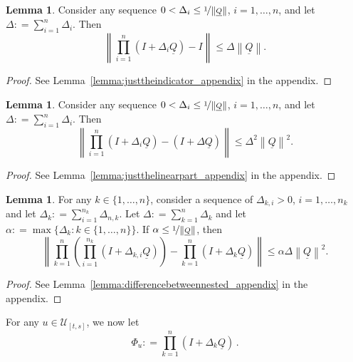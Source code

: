 \documentclass[10pt]{paper}
\theoremstyle{definition}
\newtheorem{lemma}[theorem]{Lemma}
\newcommand{\lrate}{\underline{Q}}
\newcommand{\norm}[1]{\left\lVert #1 \right\rVert}
\newcommand{\coloneqq}{:\!=}
\begin{document}
\begin{lemma}\label{lemma:justtheindicator}
Consider any sequence $0<\Delta_i\leq\nicefrac{1}{\norm{\lrate}}$, $i=1,\dots,n$, and let $\Delta\coloneqq\sum_{i=1}^n\Delta_i$. Then
\begin{equation*}
\norm{\prod_{i=1}^n(I+\Delta_i\lrate)-I}\leq\Delta\norm{\lrate}.
\end{equation*}
\end{lemma}
\begin{proof}
See Lemma~\ref{lemma:justtheindicator_appendix} in the appendix.
\end{proof}

\begin{lemma}\label{lemma:justthelinearpart}
Consider any sequence $0<\Delta_i\leq\nicefrac{1}{\norm{\lrate}}$, $i=1,\dots,n$, and let $\Delta\coloneqq\sum_{i=1}^n\Delta_i$. Then
\begin{equation*}
\norm{\prod_{i=1}^n(I+\Delta_i\lrate)-(I+\Delta\lrate)}\leq\Delta^2\norm{\lrate}^2.
\end{equation*}
\end{lemma}
\begin{proof}
See Lemma~\ref{lemma:justthelinearpart_appendix} in the appendix.
\end{proof}

\begin{lemma}\label{lemma:differencebetweennested}
For any $k\in\{1,\dots,n\}$, consider a sequence of $\Delta_{k,i}>0$, $i=1,\dots,n_k$ and let $\Delta_k\coloneqq\sum_{i=1}^{n_k}\Delta_{n,k}$. Let $\Delta\coloneqq\sum_{k=1}^n\Delta_k$ and let $\alpha\coloneqq\max\{\Delta_k\colon k\in\{1,\dots,n\}\}$. If $\alpha\leq\nicefrac{1}{\norm{\lrate}}$, then
\begin{equation*}
\norm{\prod_{k=1}^n\left(\prod_{i=1}^{n_k}(I+\Delta_{k,i}\lrate)\right)
-
\prod_{k=1}^n(I+\Delta_k\lrate)
}
\leq\alpha\Delta\norm{\lrate}^2.
\end{equation*}
\end{lemma}
\begin{proof}
See Lemma~\ref{lemma:differencebetweennested_appendix} in the appendix.
\end{proof}

\noindent For any $u\in\mathcal{U}_{[t,s]}$, we now let
\begin{equation*}
\Phi_u\coloneqq\prod_{k=1}^n(I+\Delta_k\lrate)\,.
\end{equation*}
\end{document}
